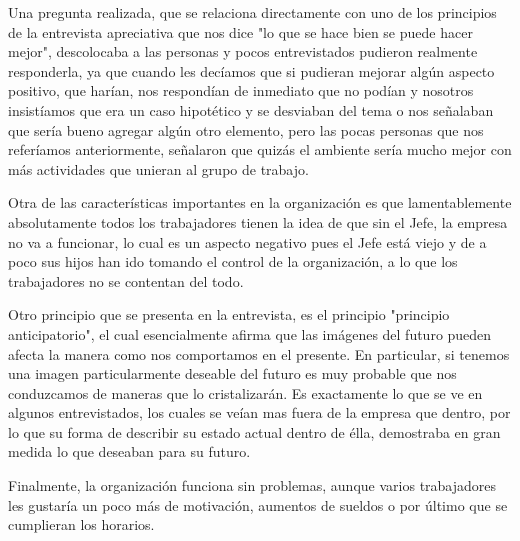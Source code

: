 Una pregunta realizada, que se relaciona directamente con uno de los principios de la
entrevista apreciativa\cite{apreciativa} que nos dice "lo que se hace bien se puede hacer mejor",
descolocaba a las personas y pocos entrevistados pudieron realmente responderla,
ya que cuando les decíamos que si pudieran mejorar algún aspecto positivo, que harían,
nos respondían de inmediato que no podían y nosotros insistíamos que era un caso
hipotético y se desviaban del tema o nos señalaban que sería bueno agregar algún otro
elemento, pero las pocas personas que nos referíamos anteriormente, señalaron que 
quizás el ambiente sería mucho mejor con más actividades que unieran al grupo de trabajo.

Otra de las características importantes en la organización es que lamentablemente absolutamente
todos los trabajadores tienen la idea de que sin el Jefe, la empresa no va a funcionar, lo cual
es un aspecto negativo pues el Jefe está viejo y de a poco sus hijos han ido tomando el control
de la organización, a lo que los trabajadores no se contentan del todo.

Otro principio que se presenta en la entrevista, es el principio "principio anticipatorio", el cual 
esencialmente afirma que las imágenes del futuro pueden afecta la manera como nos comportamos en el presente. 
En particular, si tenemos una imagen particularmente deseable del futuro es muy probable que nos conduzcamos 
de maneras que lo cristalizarán. Es exactamente lo que se ve en algunos entrevistados, los cuales se veían
mas fuera de la empresa que dentro, por lo que su forma de describir su estado actual dentro de élla, demostraba
en gran medida lo que deseaban para su futuro.

Finalmente, la organización funciona sin problemas, aunque varios trabajadores les gustaría un poco
más de motivación, aumentos de sueldos o por último que se cumplieran los horarios.

